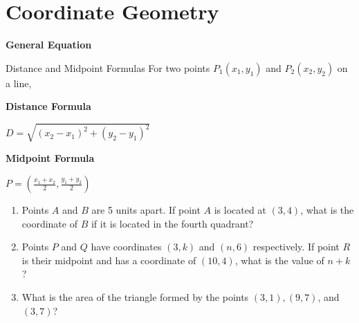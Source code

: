 \section{Coordinate Geometry}

\textbf{General Equation}

\bigskip
\begin{equationbox}{Distance and Midpoint Formulas}
\setlength{\columnseprule}{0pt}
For two points $P_1(x_1,y_1)$ and $P_2(x_2,y_2)$ on a line,

\begin{center}
\begin{multicols}{2}
\textbf{Distance Formula}

\vfill
$D=\sqrt{(x_2-x_1)^2+(y_2-y_1)^2}$

\vfill\phantom{}
\columnbreak
\textbf{Midpoint Formula}
\smallskip

\vfill
$P=\left(\frac{x_1+x_2}{2},\frac{y_1+y_2}{2}\right)$\vfill\phantom{}
\end{multicols}
\end{center}
\end{equationbox}

\vfill
\begin{enumerate}[labelindent=*,style=multiline,leftmargin=*,label=\textbf{Example \arabic*:}]
\item Points $A$ and $B$ are 5 units apart. If point $A$ is located at $(3,4)$, what is the coordinate of $B$ if it is located in the fourth quadrant?

\vfill\item Points $P$ and $Q$ have coordinates $(3,k)$ and $(n,6)$ respectively. If point $R$ is their midpoint and has a coordinate of $(10, 4)$, what is the value of $n+k$?

\vfill\item What is the area of the triangle formed by the points $(3,1), (9,7)$, and $(3,7)$?
\end{enumerate}

